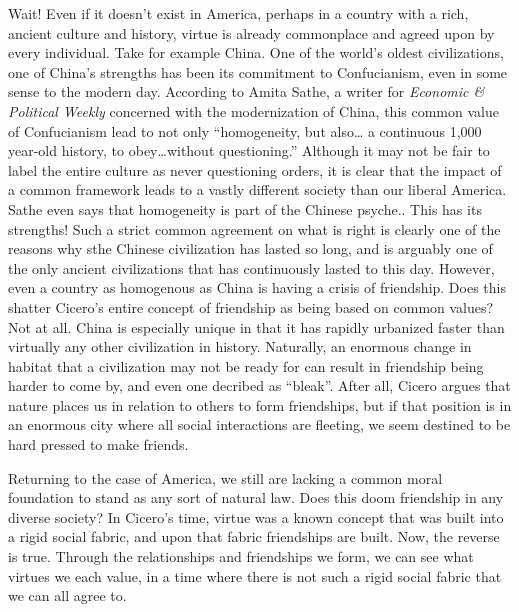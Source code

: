 \documentclass[12pt, letterpaper]{article}
\begin{document}
Wait! Even if it doesn’t exist in America, perhaps in a country with a rich, ancient culture and history, 
virtue is already commonplace and agreed upon by every individual. Take for example China. One of the world’s 
oldest civilizations, one of China’s strengths has been its commitment to Confucianism, even in some sense to 
the modern day. According to Amita Sathe, a writer for \textit{Economic \& Political Weekly} concerned with 
the modernization of China, this common value of Confucianism lead to not only ``homogeneity, but also\ldots
a continuous 1,000 year-old history, to obey\ldots without questioning.''\autocite[p. 1441]{china_thing} Although it may 
not be fair to label the entire culture as never questioning orders, it is clear that the impact of 
a common framework leads to a vastly different society than our liberal America. Sathe even says that homogeneity
is part of the Chinese psyche.\autocite[p. 1439]{china_thing}. This has its strengths! Such a strict common agreement on what is right is clearly one of the reasons why sthe Chinese 
civilization has lasted so long, and is arguably one of the only ancient civilizations that has continuously 
lasted to this day. However, even a country as homogenous as China is having a crisis of friendship. Does this 
shatter Cicero’s entire concept of friendship as being based on common values? Not at all. China is especially 
unique in that it has rapidly urbanized\autocite[p. 1439]{china_thing} faster than virtually any other civilization in history. Naturally, an 
enormous change in habitat that a civilization may not be ready for can result in friendship being harder to 
come by, and even one decribed as ``bleak''.\autocite[p. 1439]{china_thing} After all, Cicero argues that nature places us in relation to others to form friendships, but if that 
position is in an enormous city where all social interactions are fleeting, we seem destined to be hard pressed 
to make friends.

Returning to the case of America, we still are lacking a common moral foundation to stand as any sort of natural 
law. Does this doom friendship in any diverse society? In Cicero’s time, virtue was a known concept that was 
built into a rigid social fabric, and upon that fabric friendships are built. Now, the reverse is true. 
Through the relationships and friendships we form, we can see what virtues we each value, in a time where 
there is not such a rigid social fabric that we can all agree to. 
\end{document}
